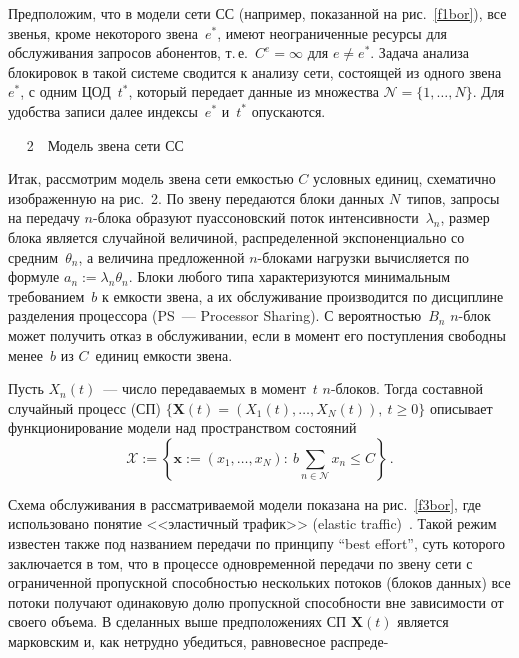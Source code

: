 \begin{multicols}{2}
  Предположим, что в модели сети СС (например, показанной на 
рис.~\ref{f1bor}), все звенья, кроме некоторого звена~$e^*$, имеют 
неограниченные ресурсы для обслуживания запросов абонентов, т.\,е.\ 
$C^e=\infty$ для $e\not= e^*$. Задача анализа блокировок в такой системе 
сводится к анализу сети, состоящей из одного звена~$e^*$, с одним 
ЦОД~$t^*$, который передает данные из множества ${\mathcal N} =\{1,\ldots ,N\}$. 
Для удобства записи далее индексы~$e^*$ и~$t^*$ опускаются.

\medskip

\begin{center} %
\vspace*{12pt}
\mbox{%
\epsfxsize=74.604mm 
}
\vspace*{4pt}
{{\figurename~2}\ \ \small{Модель звена сети СС}}
\end{center}
\vspace*{-6pt}


\bigskip
\addtocounter{figure}{1}

  
  Итак, рассмотрим модель звена сети ем\-костью $C$ условных единиц, 
схематично изображенную на рис.~2. По звену передаются блоки 
данных $N$~типов, запросы на передачу $n$-блока образуют пуассо\-новский 
поток интенсивности~$\lambda_n$, размер блока является случайной 
величиной, распределенной экспоненциально со средним~$\theta_n$, а 
величина предложенной $n$-блоками нагрузки вычисляется по формуле $a_n := 
\lambda_n\theta_n$. Блоки любого типа характеризуются минимальным 
требованием~$b$ к емкости звена, а их обслуживание производится по 
дисциплине разделения процессора (PS~--- Processor Sharing). С 
вероятностью~$B_n$ $n$-блок может получить отказ в обслуживании, если в 
момент его поступления свободны менее~$b$ из $C$~единиц емкости звена.
{\looseness=1

}


  Пусть $X_n(t)$~--- число передаваемых в момент~$t$ $n$-бло\-ков. Тогда 
составной случайный процесс (СП) $\{\mathbf{X}(t) = (X_1(t),\ldots , X_N(t)),\ 
t\geq 0\}$ описывает функционирование модели над пространством со\-сто\-яний
  $$
  {\mathcal X} := \left \{ \mathbf{x} :=(x_1,\ldots , x_N):\ b\sum\limits_{n\in {\mathcal N}} 
x_n\leq C\right \}\,.
  $$
  
  Схема обслуживания в рассматриваемой модели показана на рис.~\ref{f3bor}, 
где использовано понятие <<элас\-тич\-ный трафик>> 
(elastic traffic)~\cite{6bor, 7bor}. Такой режим известен также под названием 
передачи по принципу ``best effort'', суть которого заключается в том, что в 
процессе одновременной передачи по звену сети с ограниченной пропускной 
способностью нескольких потоков (блоков данных) все потоки получают 
одинаковую долю пропускной способности вне зависимости от своего объема. 
В сделанных выше предположениях СП $\mathbf{X}(t)$ является марковским 
и, как нетрудно убедиться, равновесное   распреде-\linebreak\vspace*{-12pt}
\columnbreak

  \end{multicols}

